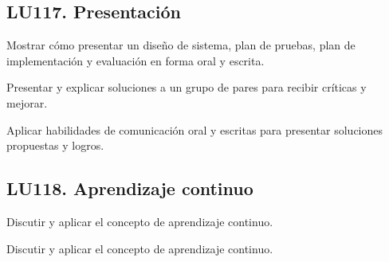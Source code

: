 \subsection{LU117. Presentación}\label{sec:BOK-LU117}\label{sec:LU117}
\begin{LearningUnit}
\begin{LUGoal}
\item Mostrar cómo presentar un diseño de sistema, plan de pruebas, plan de implementación y evaluación en forma oral y escrita.
\end{LUGoal}

\begin{LUObjective}
\item Presentar y explicar soluciones a un grupo de pares para recibir críticas y mejorar.
\item Aplicar habilidades de comunicación oral y escritas para presentar soluciones propuestas y logros.
\end{LUObjective}
\end{LearningUnit}

\subsection{LU118. Aprendizaje continuo}\label{sec:BOK-LU118}\label{sec:LU118}
\begin{LearningUnit}
\begin{LUGoal}
\item Discutir y aplicar el concepto de aprendizaje continuo.
\end{LUGoal}

\begin{LUObjective}
\item Discutir y aplicar el concepto de aprendizaje continuo.
\end{LUObjective}
\end{LearningUnit}


